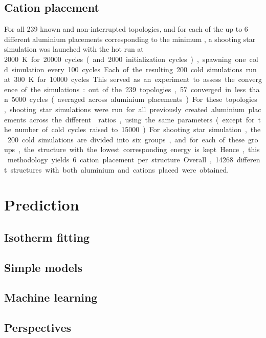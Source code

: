 \documentclass[main.tex]{subfiles}
\begin{document}
\subsection{Cation placement}

For all 239 known and non-interrupted topologies, and for each of the up to 6 different aluminium placements corresponding to the minimum \SiAl, a shooting star simulation was launched with the hot run at \qty{2000}K for \num{20000} cycles (and \num{2000} initialization cycles), spawning one cold simulation every \num{100} cycles. Each of the resulting \num{200} cold simulations run at \qty{300}K for \num{10000} cycles. This served as an experiment to assess the convergence of the simulations: out of the 239 topologies, 57 converged in less than \num{5000} cycles (averaged across aluminium placements). For these topologies, shooting star simulations were run for all previously created aluminium placements across the different \SiAl ratios, using the same parameters (except for the number of cold cycles raised to \num{15000}). For shooting star simulation, the \num{200} cold simulations are divided into six groups, and for each of these groups, the structure with the lowest corresponding energy is kept. Hence, this methodology yields 6 cation placement per structure.


Overall, \num{14268} different structures with both aluminium and cations placed were obtained.


\section{Prediction}

\subsection{Isotherm fitting}

\subsection{Simple models}

\subsection{Machine learning}


\subsection{Perspectives}

\end{document}
